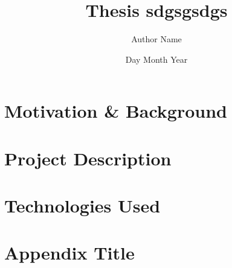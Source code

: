 \documentclass[12pt,twoside]{report}
\title{Thesis sdgsgsdgs}
\author{Author Name}
\date{Day Month Year}
\begin{document}







\tableofcontents
\label{toc}



\chapter{Motivation \& Background}


\chapter{Project Description}


\chapter{Technologies Used}


\appendix
\chapter{Appendix Title}

\printbibliography
\end{document}
